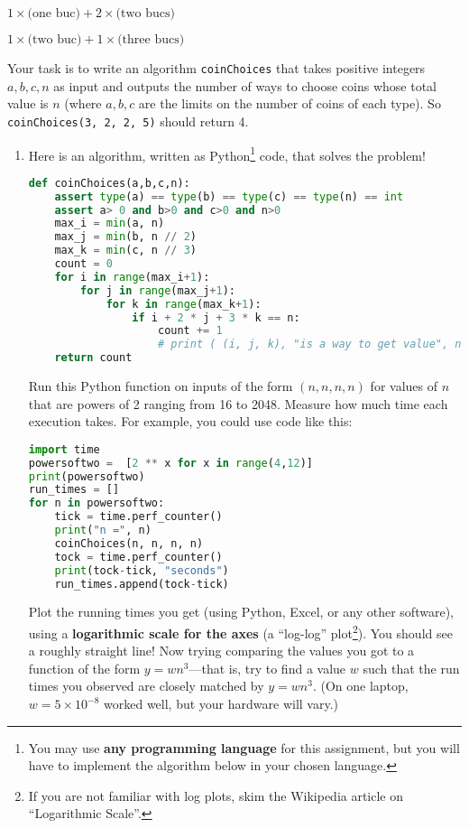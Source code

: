 \documentclass[11pt]{article}
\begin{document}
\begin{enumerate}
{    $ 1 \times \text{(one buc)} + 2 \times   \text{(two bucs)}$    
    
        $ 1 \times \text{(two buc)} + 1 \times   \text{(three bucs)}$    }
        
        Your task is to write an algorithm \texttt{coinChoices} that takes positive integers  $a,b,c, n$ as input and outputs the number of ways to choose coins whose total value is $n$ (where $a,b,c$ are the limits on the number of coins of each type). So \texttt{coinChoices(3, 2, 2, 5)} should return 4. 


\begin{enumerate}
	\item Here is an algorithm, written as Python\footnote{You may use \textbf{any programming language} for this assignment, but you will have to implement the algorithm below in your chosen language.} code, that solves the problem!
\begin{lstlisting}[language=Python]
def coinChoices(a,b,c,n):
    assert type(a) == type(b) == type(c) == type(n) == int
    assert a> 0 and b>0 and c>0 and n>0
    max_i = min(a, n)
    max_j = min(b, n // 2)
    max_k = min(c, n // 3)
    count = 0
    for i in range(max_i+1): 
        for j in range(max_j+1):
            for k in range(max_k+1): 
                if i + 2 * j + 3 * k == n:
                    count += 1
                    # print ( (i, j, k), "is a way to get value", n)
    return count
\end{lstlisting}

	Run this Python function on inputs of the form $(n, n, n, n)$ for values of $n$ that are powers of 2 ranging from 16 to 2048. Measure how much time each execution takes. For example, you could use code like this:
	
\begin{lstlisting}[language=Python]
import time
powersoftwo =  [2 ** x for x in range(4,12)]
print(powersoftwo)
run_times = []
for n in powersoftwo:
    tick = time.perf_counter()
    print("n =", n)
    coinChoices(n, n, n, n)
    tock = time.perf_counter()
    print(tock-tick, "seconds")
    run_times.append(tock-tick) 
 \end{lstlisting}

Plot the running times you get (using Python, Excel, or any other software), using a \textbf{logarithmic scale for the axes} (a ``log-log'' plot\footnote{If you are not familiar with log plots, skim the Wikipedia article on ``Logarithmic Scale''.}). You should see a roughly straight  line! Now trying comparing the values you got to a function of the form $y = w n^3$—that is, try to find a value $w$ such that the run times you observed are closely matched by  $y = w n^3$.  (On one laptop, $w = 5 \times 10^{-8}$ worked well, but your hardware will vary.)


\end{enumerate}
\end{enumerate}
\end{document}
